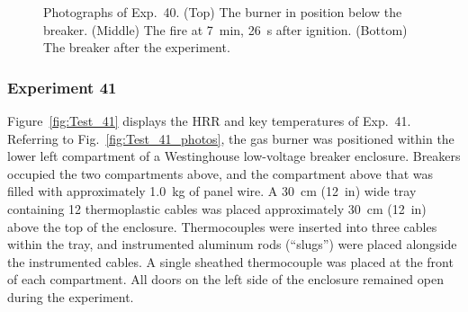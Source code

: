 \begin{figure}[p]
\caption[Photographs of Exp.~40]{Photographs of Exp.~40. (Top) The burner in position below the breaker. (Middle) The fire at 7~min, 26~s after ignition. (Bottom) The breaker after the experiment.}
\label{fig:Test_40_photos}
\end{figure}


\clearpage

\subsubsection{Experiment 41}

Figure~\ref{fig:Test_41} displays the HRR and key temperatures of Exp.~41. Referring to Fig.~\ref{fig:Test_41_photos}, the gas burner was positioned within the lower left compartment of a Westinghouse low-voltage breaker enclosure. Breakers occupied the two compartments above, and the compartment above that was filled with approximately 1.0~kg of panel wire. A 30~cm (12~in) wide tray containing 12 thermoplastic cables was placed approximately 30~cm (12~in) above the top of the enclosure. Thermocouples were inserted into three cables within the tray, and instrumented aluminum rods (``slugs'') were placed alongside the instrumented cables. A single sheathed thermocouple was placed at the front of each compartment. All doors on the left side of the enclosure remained open during the experiment.

